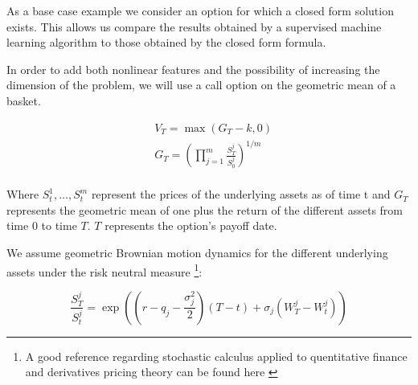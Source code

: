 As a base case example we consider an option for which a closed form solution exists. This allows us compare the results obtained by a supervised machine learning algorithm to those obtained by the closed form formula.

In order to add both nonlinear features and the possibility of increasing the dimension of the problem, we will use a call option on the geometric mean of a basket.

\begin{equation}\label{eq:geom_digital}
\begin{aligned}
&V_{T}=\max\left(G_T-k,0\right) \\
&G_{T}=\left(\prod_{j=1}^{m} \frac{S_{T}^{j}}{S_{0}^{j}}\right)^{1 / m} \\
\end{aligned}
\end{equation}

Where $S_t^1,\ldots,S_t^m$ represent the prices of the underlying assets as of time t and $G_T$ represents the geometric mean of one plus the return of the different assets from time $0$ to time $T$. $T$ represents the option's payoff date.

We assume geometric Brownian motion dynamics     for the different underlying assets under the risk neutral measure \footnote{A good reference regarding stochastic calculus applied to quentitative finance and derivatives pricing theory can be found here \cite{Borj}}:

\begin{equation}\label{eq:geom_brownianmotion}
\frac{S_{T}^{j}}{S_{t}^{j}}=\exp\left(\left(r-q_{j}-\frac{\sigma_{j}^{2}}{2}\right) \left( T - t\right)+\sigma_{j} \left(W_{T}^{j}-W_{t}^{j}\right)\right)
\end{equation}


